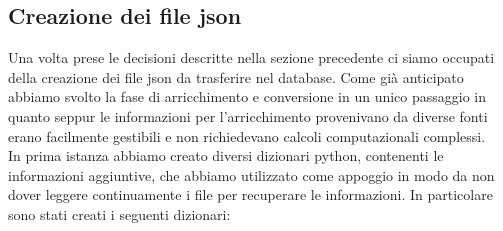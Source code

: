 \documentclass[12pt]{article}
\begin{document}
\subsection{Creazione dei file json}
Una volta prese le decisioni descritte nella sezione precedente ci siamo occupati della creazione dei file json da trasferire nel database. Come già anticipato abbiamo svolto la fase di arricchimento e conversione in un unico passaggio in quanto seppur le informazioni per l'arricchimento provenivano da diverse fonti erano facilmente gestibili e non richiedevano calcoli computazionali complessi.\\
In prima istanza abbiamo creato diversi dizionari python, contenenti le informazioni aggiuntive, che abbiamo utilizzato come appoggio in modo da non dover leggere continuamente i file per recuperare le informazioni. In particolare sono stati creati i seguenti dizionari:
\end{document}
